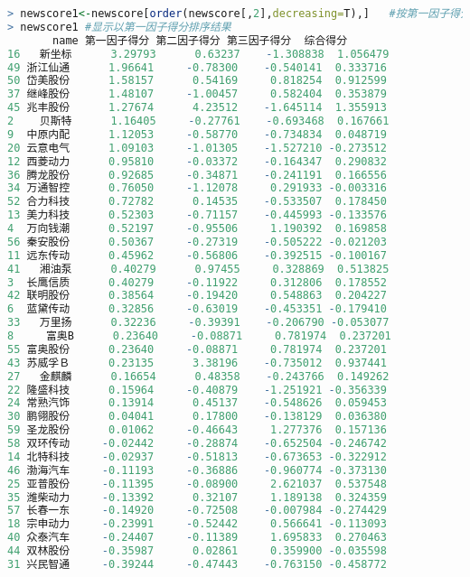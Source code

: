 \documentclass[11pt,a4paper,oneside]{book}
\begin{document}
\begin{lstlisting}[language=r]
> newscore1<-newscore[order(newscore[,2],decreasing=T),]   #按第一因子得分排序
> newscore1 #显示以第一因子得分排序结果
       name 第一因子得分 第二因子得分 第三因子得分  综合得分
16   新坐标      3.29793      0.63237    -1.308838  1.056479
49 浙江仙通      1.96641     -0.78300    -0.540141  0.333716
50 岱美股份      1.58157      0.54169     0.818254  0.912599
37 继峰股份      1.48107     -1.00457     0.582404  0.353879
45 兆丰股份      1.27674      4.23512    -1.645114  1.355913
2    贝斯特      1.16405     -0.27761    -0.693468  0.167661
9  中原内配      1.12053     -0.58770    -0.734834  0.048719
20 云意电气      1.09103     -1.01305    -1.527210 -0.273512
12 西菱动力      0.95810     -0.03372    -0.164347  0.290832
36 腾龙股份      0.92685     -0.34871    -0.241191  0.166556
34 万通智控      0.76050     -1.12078     0.291933 -0.003316
52 合力科技      0.72782      0.14535    -0.533507  0.178450
13 美力科技      0.52303     -0.71157    -0.445993 -0.133576
4  万向钱潮      0.52197     -0.95506     1.190392  0.169858
56 秦安股份      0.50367     -0.27319    -0.505222 -0.021203
11 远东传动      0.45962     -0.56806    -0.392515 -0.100167
41   湘油泵      0.40279      0.97455     0.328869  0.513825
3  长鹰信质      0.40279     -0.11922     0.312806  0.178552
42 联明股份      0.38564     -0.19420     0.548863  0.204227
6  蓝黛传动      0.32856     -0.63019    -0.453351 -0.179410
33   万里扬      0.32236     -0.39391    -0.206790 -0.053077
8     富奥B      0.23640     -0.08871     0.781974  0.237201
55 富奥股份      0.23640     -0.08871     0.781974  0.237201
43 苏威孚Ｂ      0.23135      3.38196    -0.735012  0.937441
27   金麒麟      0.16654      0.48358    -0.243766  0.149262
22 隆盛科技      0.15964     -0.40879    -1.251921 -0.356339
24 常熟汽饰      0.13914      0.45137    -0.548626  0.059453
30 鹏翎股份      0.04041      0.17800    -0.138129  0.036380
59 圣龙股份      0.01062     -0.46643     1.277376  0.157136
58 双环传动     -0.02442     -0.28874    -0.652504 -0.246742
14 北特科技     -0.02937     -0.51813    -0.673653 -0.322912
46 渤海汽车     -0.11193     -0.36886    -0.960774 -0.373130
25 亚普股份     -0.11395     -0.08900     2.621037  0.537548
35 潍柴动力     -0.13392      0.32107     1.189138  0.324359
57 长春一东     -0.14920     -0.72508    -0.007984 -0.274429
18 宗申动力     -0.23991     -0.52442     0.566641 -0.113093
40 众泰汽车     -0.24407     -0.11389     1.695833  0.270463
44 双林股份     -0.35987      0.02861     0.359900 -0.035598
31 兴民智通     -0.39244     -0.47443    -0.763150 -0.458772

\end{lstlisting}
\end{document}

